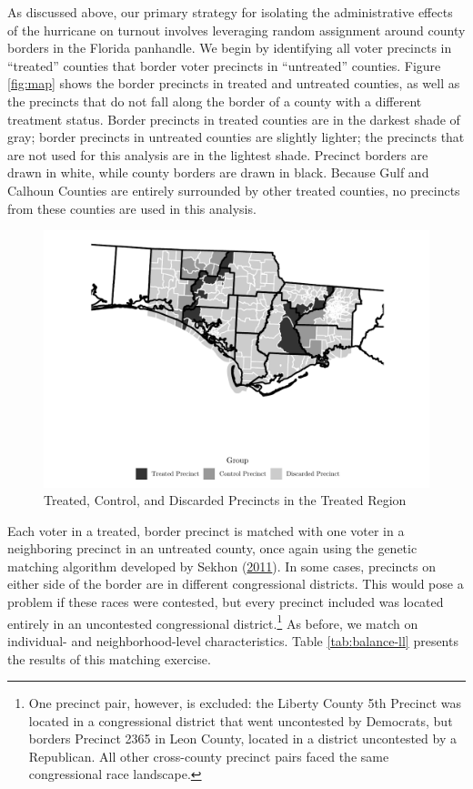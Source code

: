 \documentclass[
  12pt,
]{article}
\begin{document}
As discussed above, our primary strategy for isolating the administrative effects of the hurricane on turnout involves leveraging random assignment around county borders in the Florida panhandle. We begin by identifying all voter precincts in ``treated'' counties that border voter precincts in ``untreated'' counties. Figure \ref{fig:map} shows the border precincts in treated and untreated counties, as well as the precincts that do not fall along the border of a county with a different treatment status. Border precincts in treated counties are in the darkest shade of gray; border precincts in untreated counties are slightly lighter; the precincts that are not used for this analysis are in the lightest shade. Precinct borders are drawn in white, while county borders are drawn in black. Because Gulf and Calhoun Counties are entirely surrounded by other treated counties, no precincts from these counties are used in this analysis.

\begin{figure}[H]

{\centering \includegraphics{hurricane_michael_files/figure-latex/map-chunk-1} 

}

\caption{\label{fig:map}Treated, Control, and Discarded Precincts in the Treated Region}\label{fig:map-chunk}
\end{figure}

Each voter in a treated, border precinct is matched with one voter in a neighboring precinct in an untreated county, once again using the genetic matching algorithm developed by Sekhon (\protect\hyperlink{ref-Sekhon2011}{2011}). In some cases, precincts on either side of the border are in different congressional districts. This would pose a problem if these races were contested, but every precinct included was located entirely in an uncontested congressional district.\footnote{One precinct pair, however, is excluded: the Liberty County 5th Precinct was located in a congressional district that went uncontested by Democrats, but borders Precinct 2365 in Leon County, located in a district uncontested by a Republican. All other cross-county precinct pairs faced the same congressional race landscape.} As before, we match on individual- and neighborhood-level characteristics. Table \ref{tab:balance-ll} presents the results of this matching exercise.
\end{document}
